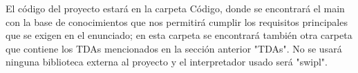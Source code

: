 El código del proyecto estará en la carpeta Código, donde se encontrará el main con la base de conocimientos que nos permitirá cumplir los
requisitos principales que se exigen en el enunciado; en esta carpeta se encontrará también otra carpeta que contiene los TDAs
 mencionados en la sección anterior "TDAs". No se usará ninguna biblioteca externa al proyecto y el interpretador usado será "swipl".